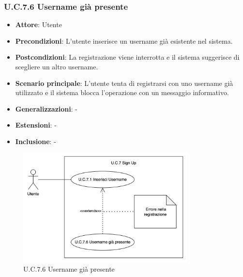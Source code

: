 \subsubsection{U.C.7.6 Username già presente}
\begin{itemize}
    \item \textbf{Attore}: Utente
    \item \textbf{Precondizioni}: L'utente inserisce un username già esistente nel sistema.
    \item \textbf{Postcondizioni}: La registrazione viene interrotta e il sistema suggerisce di scegliere un altro username.  
    \item \textbf{Scenario principale}: L'utente tenta di registrarsi con uno username già utilizzato e il sistema blocca l'operazione con un messaggio informativo. 
    \item \textbf{Generalizzazioni}: -
    \item \textbf{Estensioni}: -
    \item \textbf{Inclusione}: -
\end{itemize}
\begin{figure}[H]
    \centering
    \includegraphics[width=0.8\textwidth]{img/UC7.6.png}
    \caption{U.C.7.6 Username già presente}
\end{figure}
\newpage

